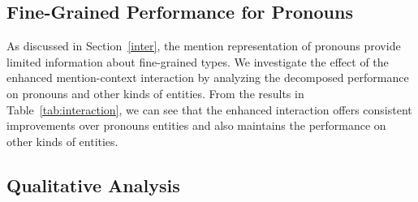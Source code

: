 \documentclass[11pt,a4paper]{article}
\begin{document}
\subsection{Fine-Grained Performance for Pronouns}
As discussed in Section~\ref{inter}, the mention representation of pronouns provide limited information about fine-grained types. We investigate the effect of the enhanced mention-context interaction by analyzing the decomposed performance on pronouns and other kinds of entities. From the results in Table~\ref{tab:interaction}, we can see that the enhanced interaction offers consistent improvements over pronouns entities and also maintains the performance on other kinds of entities.

\subsection{Qualitative Analysis}
\end{document}

